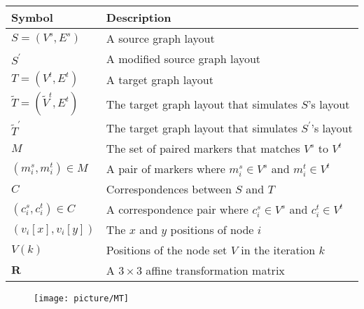 
\begin{table}[!tp]
        \caption{}
    \centering
    \renewcommand\arraystretch{1.2}
    \begin{tabular}{l|l}
         \hline
         Symbol & Description \\
         \hline
         $S=(V^s, E^s)$ & A source graph layout \\
         $S^{\prime}$ & A modified source graph layout \\
         $T=(V^t, E^t)$ & A target graph layout \\
         $\tilde{T}=(\tilde{V}^t, E^t)$ & The target graph layout that simulates $S$'s layout \\
         $\tilde{T}^{\prime}$ & The target graph layout that simulates $S^{\prime}$'s layout \\
         $M$ & The set of paired markers that matches $V^s$ to $V^t$ \\
         $(m^s_i, m^t_i) \in M$ & A pair of markers where $m^s_i \in V^s$ and $m^t_i \in V^t$ \\
         $C$ & Correspondences between $S$ and $T$ \\
         $(c^s_i, c^t_i) \in C$ & A correspondence pair where $c^s_i \in V^s$ and $c^t_i \in V^t$ \\
         $(v_i[x], v_i[y])$ & The $x$ and $y$ positions of node $i$ \\
         $V(k)$ & Positions of the node set $V$ in the iteration $k$ \\
         $\mathbf{R}$ & A $3 \times 3$ affine transformation matrix \\
         \hline
    \end{tabular}
    \label{tab:terms}
\end{table}

\begin{figure}[!t]
    \centering
    \texttt{[image: picture/MT]}
    \caption{}
    \label{fig:MT}
\end{figure}

